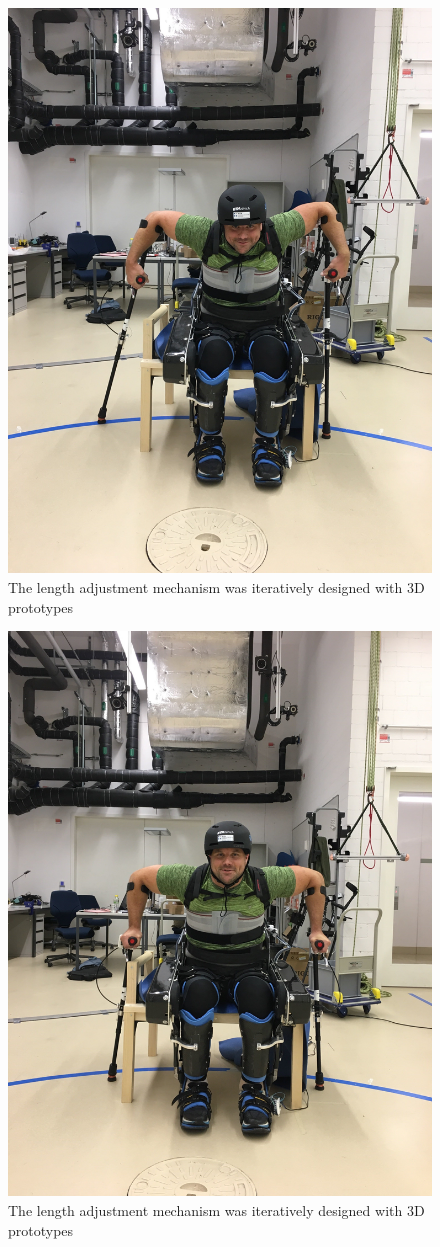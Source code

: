 \begin{figure}
    \centering
    \includegraphics[width=0.8\columnwidth]{Appendix/LAM/shouldersup.JPG}
    \caption{The length adjustment mechanism was iteratively designed with 3D prototypes}
    \label{fig:shoulderup}
\end{figure}

\begin{figure}
    \centering
    \includegraphics[width=0.8\columnwidth]{Appendix/LAM/shouldersdown.JPG}
    \caption{The length adjustment mechanism was iteratively designed with 3D prototypes}
    \label{fig:shoulderdown}
\end{figure}


